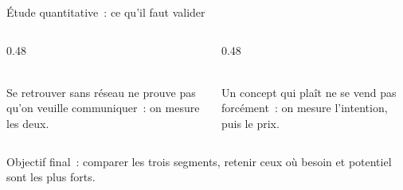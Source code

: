 \begin{frame}{Étude quantitative~: ce qu'il faut valider}
  \vspace{0.0cm}
  \begin{columns}[T]
    \begin{column}{0.48\textwidth}
      \begin{carte}[height=1.45cm,valign=top]
        \raggedright{}\\[1pt]
        {\footnotesize Se retrouver sans réseau ne prouve pas qu'on veuille communiquer~: on mesure les deux.}
      \end{carte}
    \end{column}
    \begin{column}{0.48\textwidth}
      \begin{carte}[height=1.45cm,valign=top]
        \raggedright{}\\[1pt]
        {\footnotesize Un concept qui plaît ne se vend pas forcément~: on mesure l'intention, puis le prix.}
      \end{carte}
    \end{column}
  \end{columns}
  \vspace{0.05cm}
  \begin{pcompact}\centering\footnotesize
    Objectif final~: comparer les trois segments, retenir ceux où besoin et potentiel sont les plus forts.
  \end{pcompact}
\end{frame}

